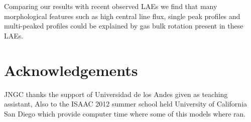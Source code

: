 \documentclass{emulateapj}
\begin{document}



Comparing our results with recent observed LAEs we find that many 
morphological features such as high central line flux, single peak
profiles and multi-peaked profiles could be explained by gas bulk 
rotation present in these LAEs.


\section*{Acknowledgements}

JNGC thanks the support of Universidad de los Andes given as teaching assistant, 
Also to the  ISAAC 2012 summer school held University of California San Diego which provide computer time
 where some of this models where ran.


 
\end{document}
